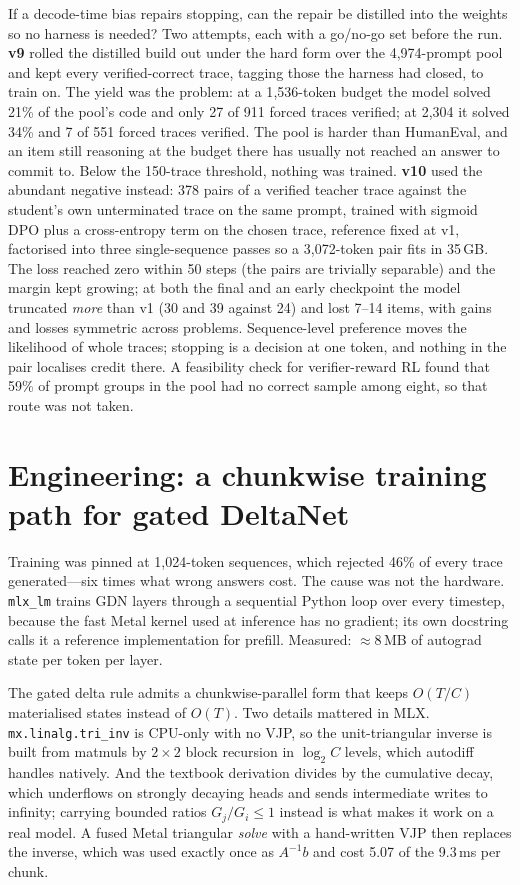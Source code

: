\documentclass[11pt]{article}
\begin{document}
If a decode-time bias repairs stopping, can the repair be distilled into the
weights so no harness is needed?  Two attempts, each with a go/no-go set before
the run.  \textbf{v9} rolled the distilled build out under the hard form over
the 4{,}974-prompt pool and kept every verified-correct trace, tagging those
the harness had closed, to train on.  The yield was the problem: at a
1{,}536-token budget the model solved 21\% of the pool's code and only 27 of
911 forced traces verified; at 2{,}304 it solved 34\% and 7 of 551 forced
traces verified.  The pool is harder than HumanEval, and an item still reasoning
at the budget there has usually not reached an answer to commit to.  Below the
150-trace threshold, nothing was trained.  \textbf{v10} used the abundant
negative instead: 378 pairs of a verified teacher trace against the student's
own unterminated trace on the same prompt, trained with sigmoid DPO
\citep{rafailov2023dpo} plus a cross-entropy term on the chosen trace, reference
fixed at v1, factorised into three single-sequence passes so a 3{,}072-token
pair fits in 35\,GB.  The loss reached zero within 50 steps (the pairs are
trivially separable) and the margin kept growing; at both the final and an
early checkpoint the model truncated \emph{more} than v1 (30 and 39 against
24) and lost 7--14 items, with gains and losses symmetric across problems.
Sequence-level preference moves the likelihood of whole traces; stopping is a
decision at one token, and nothing in the pair localises credit there.  A
feasibility check for verifier-reward RL found that 59\% of prompt groups in
the pool had no correct sample among eight, so that route was not taken.

\section{Engineering: a chunkwise training path for gated DeltaNet}
\label{sec:engineering}

Training was pinned at 1{,}024-token sequences, which rejected 46\% of every
trace generated---six times what wrong answers cost.  The cause was not the
hardware.  \texttt{mlx\_lm} \citep{mlx2023} trains GDN layers through a
sequential Python loop over every timestep, because the fast Metal kernel used
at inference has no gradient; its own docstring calls it a reference
implementation for prefill.  Measured: $\approx$8\,MB of autograd state per
token per layer.

The gated delta rule admits a chunkwise-parallel form
\citep{yang2024deltanet,yang2024gated} that keeps $O(T/C)$ materialised states
instead of $O(T)$.  Two details mattered in MLX.  \texttt{mx.linalg.tri\_inv}
is CPU-only with no VJP, so the unit-triangular inverse is built from matmuls by
$2\times2$ block recursion in $\log_2 C$ levels, which autodiff handles
natively.  And the textbook derivation divides by the cumulative decay, which
underflows on strongly decaying heads and sends intermediate writes to
infinity; carrying bounded ratios $G_j/G_i \le 1$ instead is what makes it work
on a real model.  A fused Metal triangular \emph{solve} with a hand-written VJP
then replaces the inverse, which was used exactly once as $A^{-1}b$ and cost
5.07 of the 9.3\,ms per chunk.
\end{document}
